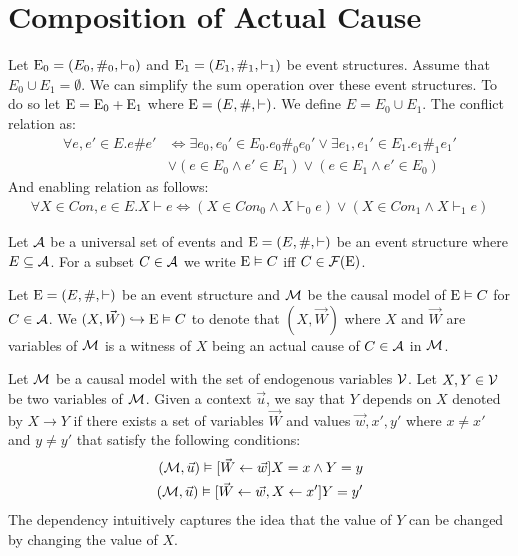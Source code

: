 \section{Composition of Actual Cause}
Let $\mathrm{E}_0 = (E_0,\#_0,\vdash_0)$ and
$\mathrm{E}_1 = (E_1,\#_1,\vdash_1)$ be event structures.
Assume that $E_0 \cup E_1 = \emptyset$.
We can simplify the sum operation over these event structures.
To do so let $ \mathrm{E} = \mathrm{E}_0 + \mathrm{E}_1$ where
$\mathrm{E} = (E,\#,\vdash)$.
We define $E = E_0 \cup E_1$.
The conflict relation as:
\begin{align*}
    \forall e,e' \in E. e \# e' & \iff
    \exists e_0,e_0' \in E_0. e_0 \#_0 e_0'
    \vee \exists e_1,e_1' \in E_1. e_1 \#_1 e_1'                                 \\
                                & \vee \left(e \in E_0 \wedge e' \in E_1 \right)
    \vee \left(e \in E_1 \wedge e' \in E_0 \right)
\end{align*}
And enabling relation as follows:
\begin{align*}
    \forall X \in Con, e \in E. X \vdash e \iff
    \left( X \in Con_0 \wedge X \vdash_0 e \right)
    \vee \left( X \in Con_1 \wedge X \vdash_1 e \right)
\end{align*}
\begin{notion}
    Let $\mathcal{A}$ be a universal set of events and $\mathrm{E} = (E,\#,\vdash)$
    be an event structure where $E \subseteq \mathcal{A}$.
    For a subset $C \in \mathcal{A}$ we write $\mathrm{E} \vDash C$ iff
    $C \in \mathcal{F}(\mathrm{E})$.
\end{notion}

\begin{notion}
    Let $\mathrm{E} = (E,\#,\vdash)$ be an event structure and
    $\mathcal{M}$ be the causal model of $ \mathrm{E} \vDash C$  for $C \in \mathcal{A}$.
    We $(X,\vec W) \hookrightarrow \mathrm{E} \vDash C$ to denote that
    $(X,\vec W)$ where $X$ and $\vec W$ are variables of $\mathcal{M}$
    is a witness of $X$ being an actual cause of $C \in \mathcal{A}$ in $\mathcal{M}$.
\end{notion}

\begin{notion}
    Let $\mathcal{M}$ be a causal model with the set of endogenous variables $\mathcal{V}$.
    Let $X,Y \in \mathcal{V}$ be two variables of $\mathcal{M}$.
    Given a context $\vec u$, we say that $Y$ depends on $X$ denoted by
    $X \to Y$ if there exists a set of variables $\vec W$ and values
    $\vec w, x', y'$ where $x \neq x'$ and $y \neq y'$ that satisfy the
    following conditions:
    \begin{align*}
        (\mathcal{M},\vec u) \vDash[\vec W \leftarrow \vec w] X = x \wedge Y = y \\
        (\mathcal{M},\vec u) \vDash[\vec W \leftarrow \vec w, X \leftarrow x'] Y = y'
    \end{align*}
    The dependency intuitively captures the idea that the value of $Y$
    can be changed by changing the value of $X$.
\end{notion}


